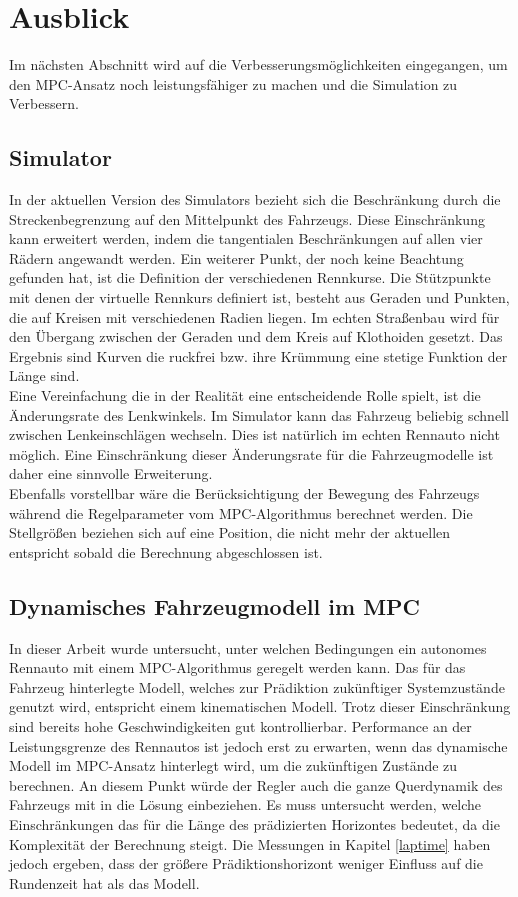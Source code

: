 \documentclass{like}
\begin{document}
\section{Ausblick}
Im nächsten Abschnitt wird auf die Verbesserungsmöglichkeiten eingegangen, um den \ac{MPC}-Ansatz noch leistungsfähiger zu machen und die Simulation zu Verbessern.
\subsection{Simulator}
In der aktuellen Version des Simulators bezieht sich die Beschränkung durch die Strecken\-be\-gren\-zung auf den Mittelpunkt des Fahrzeugs. Diese Einschränkung kann erweitert werden, indem die tangentialen Beschränkungen auf allen vier Rädern angewandt werden. Ein weiterer Punkt, der noch keine Beachtung gefunden hat, ist die Definition der ver\-schie\-den\-en Rennkurse. Die Stützpunkte mit denen der virtuelle Rennkurs definiert ist, besteht aus Geraden und Punkten, die auf Kreisen mit ver\-schie\-den\-en Radien liegen. Im echten Straßenbau wird für den Übergang zwischen der Geraden und dem Kreis auf Klothoiden gesetzt. Das Ergebnis sind Kurven die ruckfrei bzw. ihre Krümmung eine stetige Funktion der Länge sind. \\
Eine Vereinfachung die in der Realität eine entscheidende Rolle spielt, ist die Änderungsrate des Lenkwinkels. Im Simulator kann das Fahrzeug beliebig schnell zwischen Lenk\-ein\-schlä\-gen wechseln. Dies ist natürlich im echten Rennauto nicht möglich. Eine Einschränkung dieser Änderungsrate für die Fahrzeugmodelle ist daher eine sinnvolle Erweiterung.\\
Ebenfalls vorstellbar wäre die Berücksichtigung der Bewegung des Fahrzeugs während die Regelparameter vom \ac{MPC}-Algorithmus berechnet werden. Die Stellgrößen beziehen sich auf eine Position, die nicht mehr der aktuellen entspricht sobald die Berechnung abgeschlossen ist.

\subsection{Dynamisches Fahrzeugmodell im MPC}
In dieser Arbeit wurde untersucht, unter welchen Bedingungen ein autonomes Rennauto mit einem \ac{MPC}-Algorithmus geregelt werden kann. Das für das Fahrzeug hinterlegte Modell, welches zur Prädiktion zukünftiger Systemzustände genutzt wird, entspricht einem kinematischen Modell. Trotz dieser Einschränkung sind bereits hohe Geschwindigkeiten gut kontrollierbar. Performance an der Leistungsgrenze des Rennautos ist jedoch erst zu erwarten, wenn das dynamische Modell im \ac{MPC}-Ansatz hinterlegt wird, um die zukünftigen Zustände zu berechnen. An diesem Punkt würde der Regler auch die ganze Querdynamik des Fahrzeugs mit in die Lösung einbeziehen. Es muss untersucht werden, welche Einschränkungen das für die Länge des prädizierten Horizontes bedeutet, da die Komplexität der Berechnung steigt. Die Messungen in Kapitel \ref{laptime} haben jedoch ergeben, dass der größere Prädiktionshorizont weniger Einfluss auf die Rundenzeit hat als das Modell.
\end{document}
